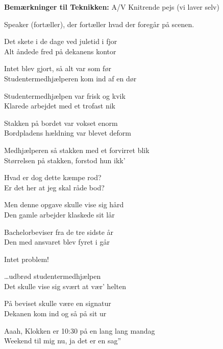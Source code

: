 \documentclass[a4paper,12pt]{article}
\begin{document}
\begin{sketch}





\scene \textbf{Bemærkninger til Teknikken: }A/V Knitrende pejs (vi laver selv)






\scene Speaker (fortæller), der fortæller hvad der foregår på scenen.

Det skete i de dage ved juletid i fjor \\
Alt åndede fred på dekanens kontor

Intet blev gjort, så alt var som før\\
Studentermedhjælperen kom ind af en dør

Studentermedhjælpen var frisk og kvik\\
Klarede arbejdet med et trofast nik

Stakken på bordet var vokset enorm\\
Bordpladens hældning var blevet deform

Medhjælperen så stakken med et forvirret blik\\
Størrelsen på stakken, forstod hun ikk'

Hvad er dog dette kæmpe rod?\\
Er det her at jeg skal råde bod?

Men denne opgave skulle vise sig hård\\
Den gamle arbejder klaskede sit lår

Bachelorbeviser fra de tre sidste år\\
Den med ansvaret blev fyret i går


Intet problem!

\ldots udbrød studentermedhjælpen\\
Det skulle vise sig svært at vær' helten


På beviset skulle være en signatur\\
Dekanen kom ind og så på sit ur

Aaah, Klokken er 10:30 på en lang lang mandag\\
Weekend til mig nu, ja det er en sag''


\end{sketch}
\end{document}
